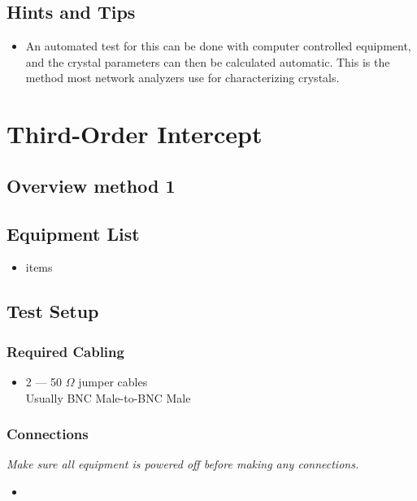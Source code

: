 \documentclass[10pt,letterpaper]{book}
\begin{document}
\subsection*{Hints and Tips}
\begin{itemize}
\item An automated test for this can be done with computer controlled equipment, and the crystal parameters can then be calculated automatic. This is the method most network analyzers use for characterizing crystals.
\end{itemize}

\newpage

\section{Third-Order Intercept}
\subsection*{Overview method 1}
\subsection*{Equipment List}
\begin{itemize}
	\item items
\end{itemize}
\subsection*{Test Setup}
\subsubsection*{Required Cabling}
\begin{itemize}
	\item 2 --- 50 $\Omega$ jumper cables \\
		Usually BNC Male-to-BNC Male
\end{itemize}
\subsubsection*{Connections}
\emph{Make sure all equipment is powered off before making any connections.}
\begin{itemize}
	\item
\end{itemize}
\end{document}
